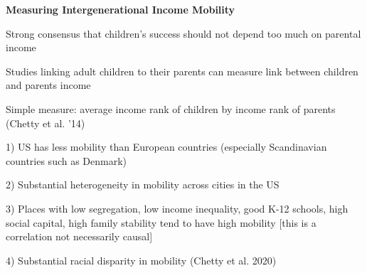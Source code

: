 \documentclass[landscape]{slides}
\begin{document}
%
%
%
%
%
%
%
%
%
%
%





\begin{slide}
\begin{center}
{\bf Measuring Intergenerational Income Mobility}
\end{center}
Strong consensus that children's success should not depend too much on parental income

Studies linking adult children to their parents can measure link between children and parents income

Simple measure: average income rank of children by income rank of parents (Chetty et al. '14)

\small

1) US has less mobility than European countries (especially Scandinavian countries such as Denmark)

2) Substantial heterogeneity in mobility across cities in the US

3) Places with low segregation, low income inequality, good K-12 schools, high social capital, high family stability 
tend to have high mobility [this is a correlation not necessarily causal]

4) Substantial racial disparity in mobility (Chetty et al. 2020)

\end{slide}
\end{document}
